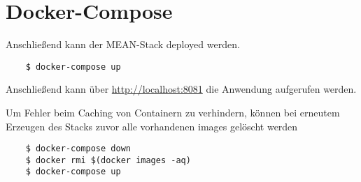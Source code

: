 \section{Docker-Compose}
Anschließend kann der MEAN-Stack deployed werden.

\begin{verbatim}
	$ docker-compose up
\end{verbatim}

Anschließend kann über \hyperlink{http://localhost:8081}{http://localhost:8081} die Anwendung aufgerufen werden.

Um Fehler beim Caching von Containern zu verhindern, können bei erneutem Erzeugen des Stacks zuvor alle vorhandenen images gelöscht werden

\begin{verbatim}
	$ docker-compose down
	$ docker rmi $(docker images -aq)
	$ docker-compose up
\end{verbatim} 